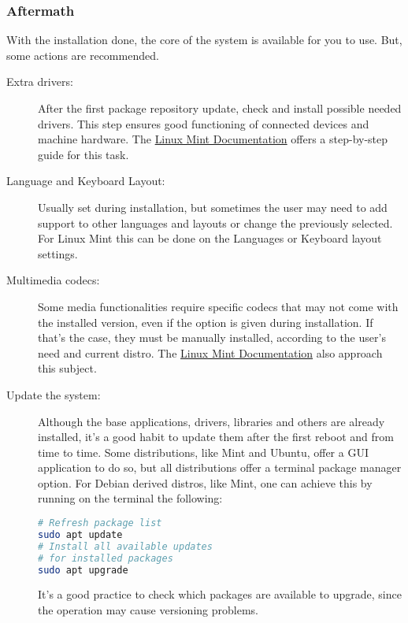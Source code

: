 \documentclass[a4paper,11pt]{article}
\begin{document}
\subsubsection{Aftermath}
With the installation done, the core of the system is available for you to use.
But, some actions are recommended.
\begin{description}
\item[Extra drivers:] After the first package repository update, check and
    install possible needed drivers. This step ensures good functioning of
    connected devices and machine hardware. The
    \href{https://linuxmint-installation-guide.readthedocs.io/en/latest/drivers.html}{Linux
    Mint Documentation} offers a step-by-step guide for this task.
\item[Language and Keyboard Layout:] Usually set during installation, but
    sometimes the user may need to add support to other languages and layouts or
    change the previously selected. For Linux Mint this can be done on the
    Languages or Keyboard layout settings.
\item[Multimedia codecs:] Some media functionalities require specific codecs that
    may not come with the installed version, even if the option is given during
    installation. If that's the case, they must be manually installed, according
    to the user's need and current distro. The
    \href{https://linuxmint-installation-guide.readthedocs.io/en/latest/codecs.html}{Linux
    Mint Documentation} also approach this subject.
    \item[Update the system:] Although the base applications, drivers, libraries
        and others are already installed, it's a good habit to update them after
        the first reboot and from time to time. Some distributions, like Mint
        and Ubuntu, offer a GUI application to do so, but all distributions
        offer a terminal package manager option. For Debian derived distros,
        like Mint, one can achieve this by running on the terminal the
        following:
\begin{lstlisting}[language=bash]
# Refresh package list
sudo apt update
# Install all available updates
# for installed packages
sudo apt upgrade
\end{lstlisting}
\begin{tipbox}
It's a good practice to check which packages are available to upgrade, since the
operation may cause versioning problems.
\end{tipbox}
\end{description}
\end{document}

